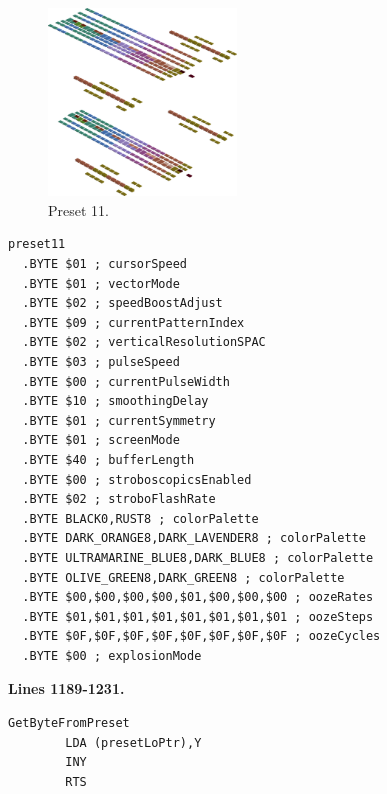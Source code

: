 \vspace*{0.5cm}
\begin{minipage}[b]{0.48\linewidth}
\begin{figure}[H]                                                          
  \centering                                                             
  \begin{adjustbox}{width=5cm,center}                                   
  \includegraphics[width=5cm]{src/colorspace_presets/preset11-45.png}%
  \end{adjustbox}                                                        
\caption*{Preset 11.}                                           
\end{figure}                                                               
\end{minipage}
\hspace{0.1cm}
\begin{minipage}[b]{0.48\linewidth}                                                                         
\begin{lstlisting}[basicstyle=\ttfamily\tiny]
preset11
  .BYTE $01 ; cursorSpeed
  .BYTE $01 ; vectorMode
  .BYTE $02 ; speedBoostAdjust
  .BYTE $09 ; currentPatternIndex
  .BYTE $02 ; verticalResolutionSPAC
  .BYTE $03 ; pulseSpeed
  .BYTE $00 ; currentPulseWidth
  .BYTE $10 ; smoothingDelay
  .BYTE $01 ; currentSymmetry
  .BYTE $01 ; screenMode
  .BYTE $40 ; bufferLength
  .BYTE $00 ; stroboscopicsEnabled
  .BYTE $02 ; stroboFlashRate
  .BYTE BLACK0,RUST8 ; colorPalette
  .BYTE DARK_ORANGE8,DARK_LAVENDER8 ; colorPalette
  .BYTE ULTRAMARINE_BLUE8,DARK_BLUE8 ; colorPalette
  .BYTE OLIVE_GREEN8,DARK_GREEN8 ; colorPalette
  .BYTE $00,$00,$00,$00,$01,$00,$00,$00 ; oozeRates
  .BYTE $01,$01,$01,$01,$01,$01,$01,$01 ; oozeSteps
  .BYTE $0F,$0F,$0F,$0F,$0F,$0F,$0F,$0F ; oozeCycles
  .BYTE $00 ; explosionMode
\end{lstlisting}
\end{minipage}
\clearpage
\textbf{Lines 1189-1231. } 
\begin{lstlisting}
GetByteFromPreset
        LDA (presetLoPtr),Y
        INY 
        RTS 
\end{lstlisting}

